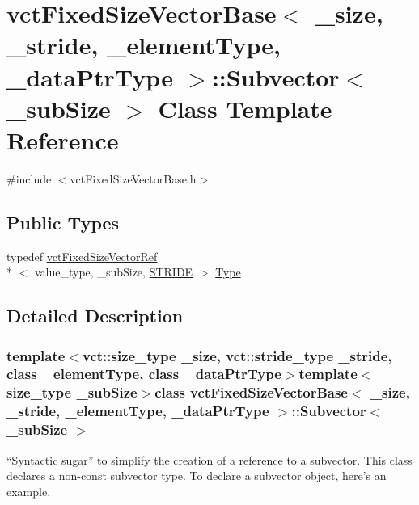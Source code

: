 \hypertarget{classvct_fixed_size_vector_base_1_1_subvector}{\section{vct\-Fixed\-Size\-Vector\-Base$<$ \-\_\-size, \-\_\-stride, \-\_\-element\-Type, \-\_\-data\-Ptr\-Type $>$\-:\-:Subvector$<$ \-\_\-sub\-Size $>$ Class Template Reference}
\label{classvct_fixed_size_vector_base_1_1_subvector}
}


{\ttfamily \#include $<$vct\-Fixed\-Size\-Vector\-Base.\-h$>$}

\subsection*{Public Types}
\begin{DoxyCompactItemize}
\item 
typedef \hyperlink{classvct_fixed_size_vector_ref}{vct\-Fixed\-Size\-Vector\-Ref}\\*
$<$ value\-\_\-type, \-\_\-sub\-Size, \hyperlink{classvct_fixed_size_vector_base_ace3f97f061ae60acb29f9719787d18a3a953b66e9631c2c4ff134062e7e09a37d}{S\-T\-R\-I\-D\-E} $>$ \hyperlink{classvct_fixed_size_vector_base_1_1_subvector_a069ff7943ff217639b0dbb273d052647}{Type}
\end{DoxyCompactItemize}


\subsection{Detailed Description}
\subsubsection*{template$<$vct\-::size\-\_\-type \-\_\-size, vct\-::stride\-\_\-type \-\_\-stride, class \-\_\-element\-Type, class \-\_\-data\-Ptr\-Type$>$template$<$size\-\_\-type \-\_\-sub\-Size$>$class vct\-Fixed\-Size\-Vector\-Base$<$ \-\_\-size, \-\_\-stride, \-\_\-element\-Type, \-\_\-data\-Ptr\-Type $>$\-::\-Subvector$<$ \-\_\-sub\-Size $>$}

``\-Syntactic sugar'' to simplify the creation of a reference to a subvector. This class declares a non-\/const subvector type. To declare a subvector object, here's an example.

